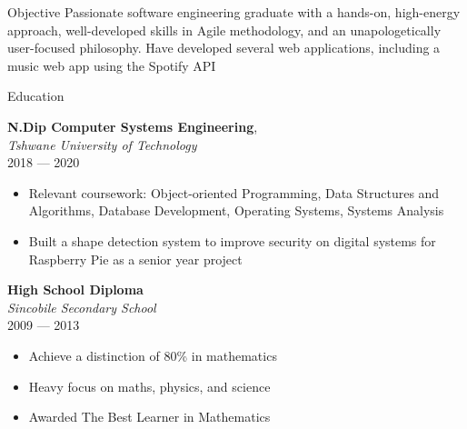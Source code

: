 \documentclass{resume} %
\newcommand{\sepspace}{\vspace*{0.5em}}           %
\begin{document}
\begin{rSection}{Objective}
    Passionate software engineering graduate with a hands-on, high-energy approach, well-developed skills in Agile methodology, and an unapologetically user-focused philosophy. Have developed several web applications, including a music web app using the Spotify API
\end{rSection}


\begin{rSection}{Education}

        \textbf{N.Dip Computer Systems Engineering}, \\
        \textsl{Tshwane University of Technology} \\
        \textmd{2018 --- 2020}
        \begin{itemize}[noitemsep,topsep=-6pt]

          \item Relevant coursework: Object-oriented Programming, Data Structures and Algorithms, Database Development, Operating Systems, Systems Analysis
            

          \item Built a shape detection system to improve security on digital systems for Raspberry Pie as a senior year project
        \end{itemize}

        \sepspace

        \textbf{High School Diploma} \\
        \textsl{Sincobile Secondary School} \\
        \textmd{2009 --- 2013}
        \begin{itemize}[noitemsep,topsep=-6pt]
          \item Achieve a distinction of 80\% in mathematics
          \item Heavy focus on maths, physics, and science
          \item Awarded The Best Learner in Mathematics 
        \end{itemize}
    
\end{rSection}
\end{document}
